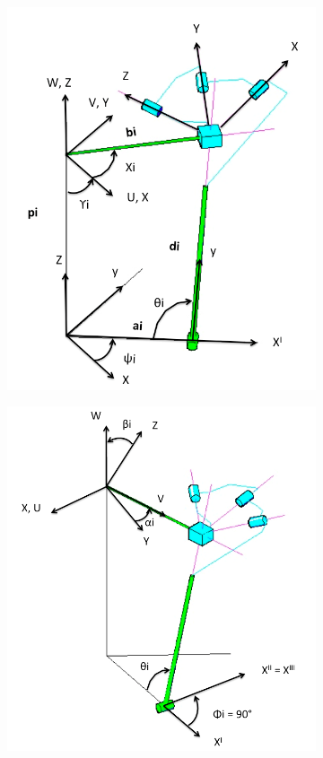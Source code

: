 \documentclass[titlepage, letterpaper]{article}
\begin{document}
\begin{figure}[htbp]
    \centering
    \begin{subfigure}[b]{0.45\textwidth}
        \includegraphics[width=\linewidth]{fig_schema_a}
    \end{subfigure}
    \begin{subfigure}[b]{0.45\textwidth}
        \includegraphics[width=\linewidth]{fig_schema_b}

\end{subfigure}
\end{figure}
\end{document}

